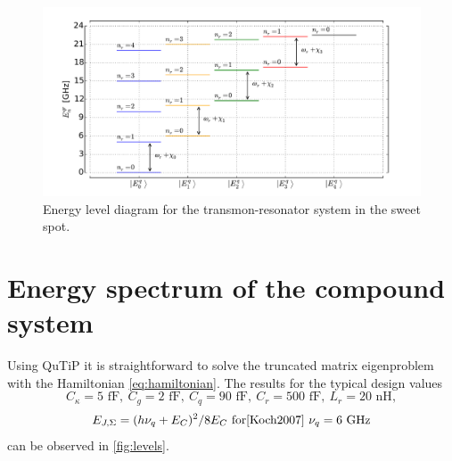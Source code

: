 \documentclass[12pt]{report}
\numberwithin{equation}{section}
\begin{document}
\begin{figure}
\centering
\includegraphics[width=\textwidth]{diagram}
\caption{Energy level diagram for the transmon-resonator system in the sweet spot.}
\label{fig:diagram}
\end{figure}


\section{Energy spectrum of the compound system}

Using QuTiP\cite{Johansson2011} it is straightforward to solve the truncated matrix eigenproblem with the Hamiltonian \eqref{eq:hamiltonian}. The results for the typical design values
$$
C_\kappa = 5 \text{ fF},\ C_g = 2 \text{ fF},\ C_q = 90 \text{ fF},\ C_r = 500 \text{ fF},\ L_r = 20 \text{ nH}, $$
$$E_{J, \Sigma} = (h \nu_q + E_C)^2/8 E_C\ \text{for\cite{Koch2007}}\ \nu_q = 6\ \text{GHz}
$$
can be observed in \autoref{fig:levels}.
\end{document}
